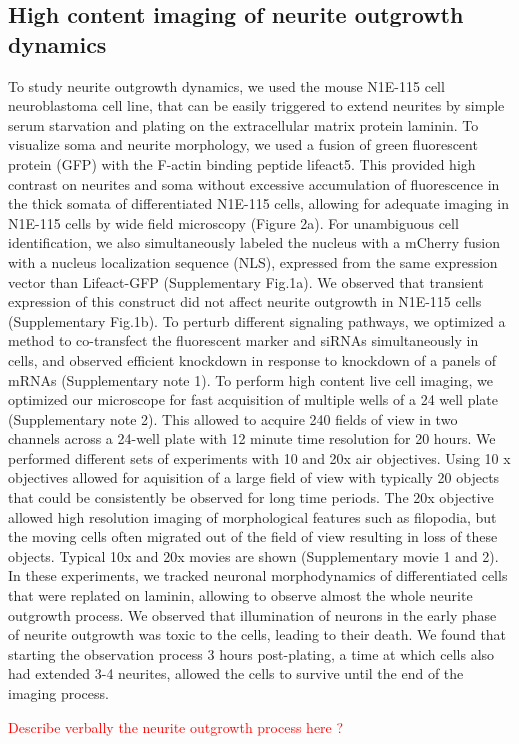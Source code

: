 \subsection{High content imaging of neurite outgrowth dynamics}
To study neurite outgrowth dynamics, we used the mouse N1E-115 cell neuroblastoma cell line, that can be easily triggered to extend neurites by simple serum starvation and plating on the extracellular matrix protein laminin. To visualize soma and neurite morphology, we used a fusion of green fluorescent protein (GFP) with the F-actin binding peptide lifeact5. This provided high contrast on neurites and soma without excessive accumulation of fluorescence in the thick somata of differentiated N1E-115 cells, allowing for adequate imaging in N1E-115 cells by wide field microscopy (Figure 2a). For unambiguous cell identification, we also simultaneously labeled the nucleus with a mCherry fusion with a nucleus localization sequence (NLS), expressed from the same expression vector than Lifeact-GFP (Supplementary Fig.1a). We observed that transient expression of this construct did not affect neurite outgrowth in N1E-115 cells (Supplementary Fig.1b). To perturb different signaling pathways, we optimized a method to co-transfect the fluorescent marker and siRNAs simultaneously in cells, and observed efficient knockdown in response to knockdown of a panels of mRNAs (Supplementary note 1). To perform high content live cell imaging, we optimized our microscope for fast acquisition of multiple wells of a 24 well plate (Supplementary note 2). This allowed to acquire 240 fields of view in two channels across a 24-well plate with 12 minute time resolution for 20 hours. We performed different sets of experiments with 10 and 20x air objectives. Using 10 x objectives allowed for aquisition of a large field of view with typically 20 objects that could be consistently be observed for long time periods. The 20x objective allowed high resolution imaging of morphological features such as filopodia, but the moving cells often migrated out of the field of view resulting in loss of these objects. Typical 10x and 20x movies are shown (Supplementary movie 1 and 2). In these experiments, we tracked neuronal morphodynamics of differentiated cells that were replated on laminin, allowing to observe almost the whole neurite outgrowth process. We observed that illumination of neurons in the early phase of neurite outgrowth was toxic to the cells, leading to their death. We found that starting the observation process 3 hours post-plating, a time at which cells also had extended 3-4 neurites, allowed the cells to survive until the end of the imaging process.

\textcolor{red}{Describe verbally the neurite outgrowth process here ?}
